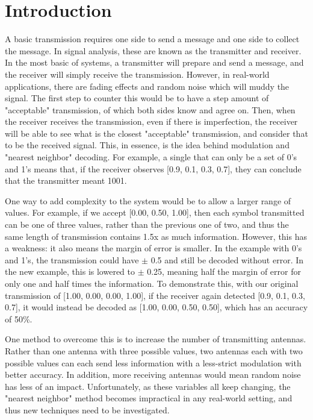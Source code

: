 \documentclass[conference]{IEEEtran}
\begin{document}
\IEEEpeerreviewmaketitle

\section{Introduction}
A basic transmission requires one side to send a message and one side to collect the message. In signal analysis, these are known as the transmitter and receiver. In the most basic of systems, a transmitter will prepare and send a message, and the receiver will simply receive the transmission. However, in real-world applications, there are fading effects and random noise which will muddy the signal. The first step to counter this would be to have a step amount of "acceptable" transmission, of which both sides know and agree on. Then, when the receiver receives the transmission, even if there is imperfection, the receiver will be able to see what is the closest "acceptable" transmission, and consider that to be the received signal. This, in essence, is the idea behind modulation and "nearest neighbor" decoding. For example, a single that can only be a set of 0's and 1's means that, if the receiver observes [0.9, 0.1, 0.3, 0.7], they can conclude that the transmitter meant 1001. \par
One way to add complexity to the system would be to allow a larger range of values. For example, if we accept [0.00, 0.50, 1.00], then each symbol transmitted can be one of three values, rather than the previous one of two, and thus the same length of transmission contains 1.5x as much information. However, this has a weakness: it also means the margin of error is smaller. In the example with 0's and 1's, the transmission could have $\pm$ 0.5 and still be decoded without error. In the new example, this is lowered to $\pm$ 0.25, meaning half the margin of error for only one and half times the information. To demonstrate this, with our original transmission of [1.00, 0.00, 0.00, 1.00], if the receiver again detected [0.9, 0.1, 0.3, 0.7], it would instead be decoded as [1.00, 0.00, 0.50, 0.50], which has an accuracy of 50\%.\par
One method to overcome this is to increase the number of transmitting antennas. Rather than one antenna with three possible values, two antennas each with two possible values can each send less information with a less-strict modulation with better accuracy. In addition, more receiving antennas would mean random noise has less of an impact. Unfortunately, as these variables all keep changing, the "nearest neighbor" method becomes impractical in any real-world setting, and thus new techniques need to be investigated.\par
\end{document}
